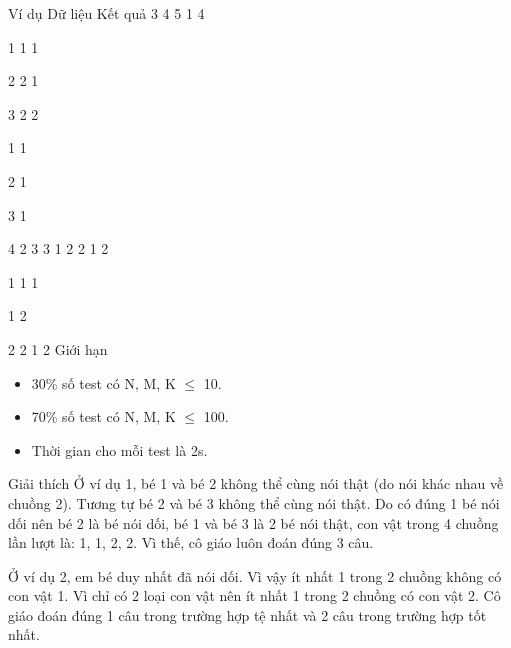 Ví dụ
Dữ liệu                   Kết quả                   3 4 5 1 4         

           1 1 1          

           2 2 1          

           3 2 2          

           1 1          

           2 1          

           3 1          

           4 2                    3 3                   1 2 2 1 2         

           1 1 1          

           1 2          

           2 2                    1 2
Giới hạn
\begin{itemize}
	\item        30\% số test có    N, M, K  $\le$  10.      
	\item        70\% số test có    N, M, K  $\le$  100.      
	\item        Thời gian cho    mỗi test là 2s.      
\end{itemize}
Giải thích
Ở ví dụ 1, bé 1 và bé  2 không thể cùng nói thật (do nói khác nhau về chuồng 2).  Tương tự bé 2 và bé 3 không thể cùng nói thật. Do có  đúng 1 bé nói dối nên bé 2 là bé nói dối, bé 1 và bé  3 là 2 bé nói thật, con vật trong 4 chuồng lần lượt là:  1, 1, 2, 2. Vì thế, cô giáo luôn đoán đúng 3 câu.     

      Ở ví dụ 2, em bé duy  nhất đã nói dối. Vì vậy ít nhất 1 trong 2 chuồng không  có con vật 1. Vì chỉ có 2 loại con vật nên ít nhất 1  trong 2 chuồng có con vật 2. Cô giáo đoán đúng 1 câu trong  trường hợp tệ nhất và 2 câu trong trường hợp tốt nhất.